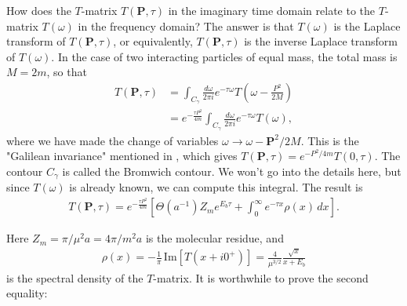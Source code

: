 \documentclass{article}
\theoremstyle{definition}
\begin{document}
\noindent How does the $T$-matrix $T(\mathbf{P},\tau)$ in the imaginary time domain relate to the $T$-matrix $T(\omega)$ in the frequency domain? The answer is that $T(\omega)$ is the Laplace transform of $T(\mathbf{P},\tau)$, or equivalently, $T(\mathbf{P}, \tau)$ is the inverse Laplace transform of $T(\omega)$. In the case of two interacting particles of equal mass, the total mass is $M = 2m$, so that 
\begin{align}
T(\mathbf{P},\tau) 
&=  \int_{C_\gamma} \frac{d\omega}{2\pi i} e^{-\tau \omega} T\left( \omega - \frac{P^2}{2M} \right) \\
&= e^{-\frac{\tau P^2}{4m}} \int_{C_\gamma} \frac{d\omega}{2\pi i} e^{-\tau \omega} T(\omega),
\end{align}
where we have made the change of variables $\omega \to \omega - \mathbf{P}^2/2M$. This is the "Galilean invariance" mentioned in \cite{sun2015high}, which gives $T(\mathbf{P},\tau) = e^{-P^2/4m} T(0,\tau)$. The contour $C_\gamma$ is called the Bromwich contour. We won't go into the details here, but since $T(\omega)$ is already known, we can compute this integral. The result is \cite{sun2015high}
\begin{align}
T(\mathbf{P}, \tau) = e^{-\frac{\tau P^2}{4m}} \left[ \Theta(a^{-1}) Z_m e^{E_b \tau} + \int_0^\infty e^{-\tau x} \rho(x)\,dx\right].
\end{align}

\noindent Here $Z_m = \pi / \mu^2 a = 4\pi / m^2 a$ is the molecular residue, and 
\begin{align}
\rho(x) 
= -\frac{1}{\pi} \,\text{Im}[T(x + i0^+)] 
= \frac{4}{\mu^{3/2}} \frac{\sqrt{x}}{x + E_b}
\end{align}
is the spectral density of the $T$-matrix. It is worthwhile to prove the second equality:\\
\end{document}
